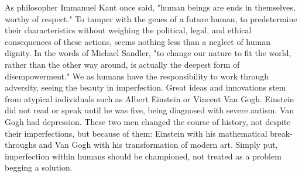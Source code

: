    As philosopher Immanuel Kant once said, "human beings are ends in
   themselves, worthy of respect."  To tamper with the genes of a future
   human, to predetermine their characteristics without weighing the
   political, legal, and ethical consequences of these actions, seems
   nothing less than a neglect of human dignity.  In the words of Michael
   Sandler, "to change our nature to fit the world, rather than the other
   way around, is actually the deepest form of disempowerment." We as
   humans have the responsibility to work through adversity, seeing the
   beauty in imperfection. Great ideas and innovations stem from atypical
   individuals such as Albert Einstein or Vincent Van Gogh. Einstein did
   not read or speak until he was five, being diagnosed with severe
   autism. Van Gogh had depression. These two men changed the course of
   history, not despite their imperfections, but because of them: Einstein
   with his mathematical break-throughs and Van Gogh with his
   transformation of modern art. Simply put, imperfection within humans
   should be championed, not treated as a problem begging a solution.

